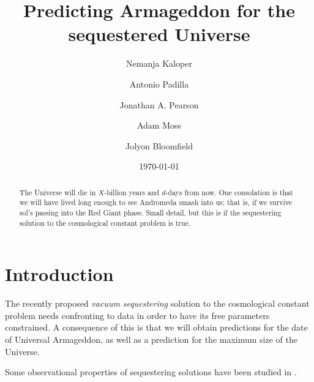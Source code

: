 \documentclass[amsmath,amssymb,10pt,twocolumn,eqsecnum]{revtex4}
\begin{document}
 

\title{Predicting Armageddon for the sequestered Universe}

\author{Nemanja Kaloper}

\author{Antonio Padilla}

\author{Jonathan A. Pearson}

\author{Adam Moss}


\author{Jolyon Bloomfield}

\date{\today}


\begin{abstract} 
The Universe will die in $X$-billion years and $d$-days from now. One consolation is that we will have lived long enough to see Andromeda smash into us; that is, if we survive sol's passing into the Red Giant phase. Small detail, but this is if the sequestering solution to the cosmological constant problem is true.
\end{abstract}

\maketitle
\section{Introduction}
The recently proposed \textit{vacuum sequestering} solution to the cosmological constant problem \cite{Kaloper:2013zca, Kaloper:2014dqa, Kaloper:2014fca} needs confronting to data in order to have its free parameters constrained. A consequence of this is that we will obtain predictions for the date of  Universal Armageddon, as well as a prediction for the maximum size of the Universe.

Some observational properties of sequestering solutions have been studied in \cite{Avelino:2014nqa, Avelino:2014aea, Kluson:2014tma}.
\end{document}
